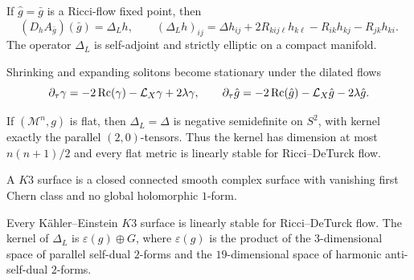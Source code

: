 \begin{proposition}
\label{prop:chow-iv-lichnerowicz-linearization}

If $\hat g=\bar g$ is a Ricci-flow fixed point, then
\[
 (D_hA_{\bar g})(\bar g)=\Delta_Lh,
 \qquad
 (\Delta_Lh)_{ij}=\Delta h_{ij}+2R_{kij\ell}h_{k\ell}-R_{ik}h_{kj}-R_{jk}h_{ki}.
 \tag{35.7}
\]
The operator $\Delta_L$ is self-adjoint and strictly elliptic on a compact
manifold.
\end{proposition}

Shrinking and expanding solitons become stationary under the dilated flows
\[
 \partial_\tau\gamma=-2\operatorname{Rc}(\gamma)-\mathcal L_X\gamma+2\lambda\gamma,
 \qquad
 \partial_\tau\hat g=-2\operatorname{Rc}(\hat g)-\mathcal L_X\hat g-2\lambda\hat g.
\]

\begin{proposition}
\label{prop:chow-iv-flat-linear-stability}

If $(\mathcal M^n,g)$ is flat, then $\Delta_L=\Delta$ is negative
semidefinite on $S^2$, with kernel exactly the parallel $(2,0)$-tensors.
Thus the kernel has dimension at most $n(n+1)/2$ and every flat metric is
linearly stable for Ricci--DeTurck flow.
\end{proposition}

\begin{definition}
\label{def:chow-iv-k3-surface}

A $K3$ surface is a closed connected smooth complex surface with vanishing
first Chern class and no global holomorphic $1$-form.
\end{definition}

\begin{proposition}
\label{prop:chow-iv-k3-linear-stability}


Every K\"ahler--Einstein $K3$ surface is linearly stable for Ricci--DeTurck
flow.  The kernel of $\Delta_L$ is $\varepsilon(g)\oplus G$, where
$\varepsilon(g)$ is the product of the $3$-dimensional space of parallel
self-dual $2$-forms and the $19$-dimensional space of harmonic anti-self-dual
$2$-forms.
\end{proposition}


